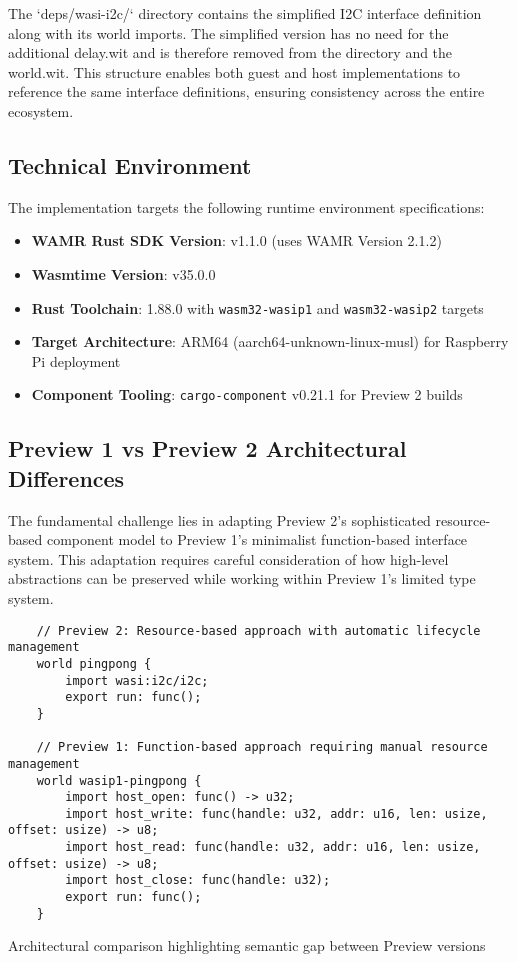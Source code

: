The `deps/wasi-i2c/` directory contains the simplified I2C interface definition along with its world imports. The simplified version has no need for the additional delay.wit and is therefore removed from the directory and the world.wit. This structure enables both guest and host implementations to reference the same interface definitions, ensuring consistency across the entire ecosystem.

\subsection{Technical Environment}

The implementation targets the following runtime environment specifications:

\begin{itemize}
    \item \textbf{WAMR Rust SDK Version}: v1.1.0 (uses WAMR Version 2.1.2)
    \item \textbf{Wasmtime Version}: v35.0.0
    \item \textbf{Rust Toolchain}: 1.88.0 with \texttt{wasm32-wasip1} and \texttt{wasm32-wasip2} targets
    \item \textbf{Target Architecture}: ARM64 (aarch64-unknown-linux-musl) for Raspberry Pi deployment
    \item \textbf{Component Tooling}: \texttt{cargo-component} v0.21.1 for Preview 2 builds
\end{itemize}

\subsection{Preview 1 vs Preview 2 Architectural Differences}

The fundamental challenge lies in adapting Preview 2's sophisticated resource-based component model to Preview 1's minimalist function-based interface system. This adaptation requires careful consideration of how high-level abstractions can be preserved while working within Preview 1's limited type system.

\begin{listing}[H]
    \begin{verbatim}
    // Preview 2: Resource-based approach with automatic lifecycle management
    world pingpong {
        import wasi:i2c/i2c;
        export run: func();
    }
    
    // Preview 1: Function-based approach requiring manual resource management
    world wasip1-pingpong {
        import host_open: func() -> u32;
        import host_write: func(handle: u32, addr: u16, len: usize, offset: usize) -> u8;
        import host_read: func(handle: u32, addr: u16, len: usize, offset: usize) -> u8;
        import host_close: func(handle: u32);
        export run: func();
    }
    \end{verbatim}
    \caption{Architectural comparison highlighting semantic gap between Preview versions}
    \label{lst:preview-comparison}
\end{listing}

